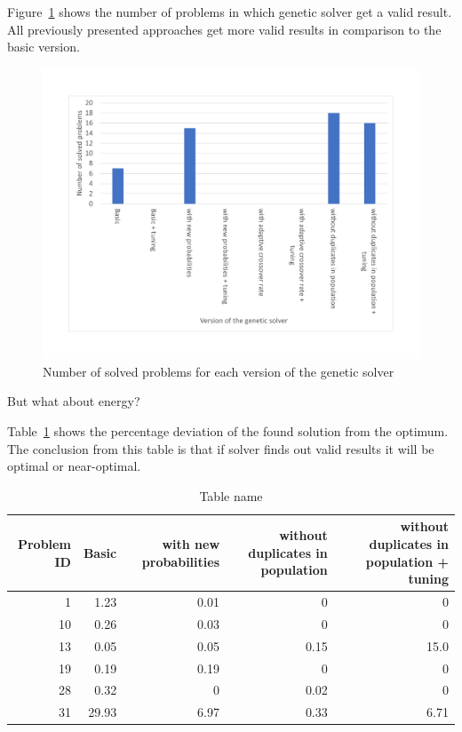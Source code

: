 Figure~\ref{fig:EvaluationNumberOfSolvedProblems} shows the number of problems in which genetic solver get a valid result.
All previously presented approaches get more valid results in comparison to the basic version.
\begin{figure}
	\centering
	\includegraphics[width=\textwidth]{images/EvaluationNumberOfSolvedProblems.pdf}
	\caption[Number of problems for each version of the genetic solver]{Number of solved problems for each version of the genetic solver}
	\label{fig:EvaluationNumberOfSolvedProblems}
\end{figure}


But what about energy?


Table~\ref{tab:EnergyTable} shows the percentage deviation of the found solution from the optimum.
The conclusion from this table is that if solver finds out valid results it will be optimal or near-optimal.

\begin{table}
	\begin{tabularx}{\textwidth}{@{}rrrrr@{}}
		\toprule
		\textbf{Problem ID} & \textbf{Basic} &
		\textbf{with new probabilities} & \textbf{without duplicates in population} & \textbf{without duplicates in population + tuning} 
		\tabularnewline
		\midrule
		1 & 1.23 & 0.01 & 0 & 0
		\tabularnewline
		10 & 0.26 & 0.03 & 0 & 0
		\tabularnewline
		13 & 0.05 & 0.05 & 0.15 & 15.0
		\tabularnewline
		19 & 0.19 & 0.19 & 0 & 0
		\tabularnewline
		28 & 0.32 & 0 & 0.02 & 0
		\tabularnewline
		31 & 29.93 & 6.97 & 0.33 & 6.71
		\tabularnewline
		\bottomrule
	\end{tabularx}
	\caption{Table name}\label{tab:EnergyTable}
\end{table}



